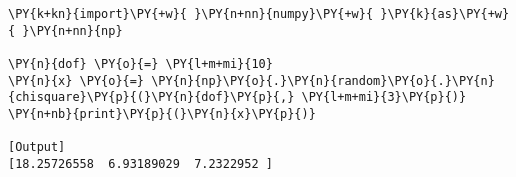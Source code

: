 \begin{Verbatim}[label=\makebox{\href{https://github.com/unipi-physics-labs/lab1-notes/tree/main/snippy/np.random.chisquare.py}{https://github.com/.../np.random.chisquare.py}},commandchars=\\\{\}]
\PY{k+kn}{import}\PY{+w}{ }\PY{n+nn}{numpy}\PY{+w}{ }\PY{k}{as}\PY{+w}{ }\PY{n+nn}{np}

\PY{n}{dof} \PY{o}{=} \PY{l+m+mi}{10}
\PY{n}{x} \PY{o}{=} \PY{n}{np}\PY{o}{.}\PY{n}{random}\PY{o}{.}\PY{n}{chisquare}\PY{p}{(}\PY{n}{dof}\PY{p}{,} \PY{l+m+mi}{3}\PY{p}{)}
\PY{n+nb}{print}\PY{p}{(}\PY{n}{x}\PY{p}{)}

[Output]
[18.25726558  6.93189029  7.2322952 ]
\end{Verbatim}
